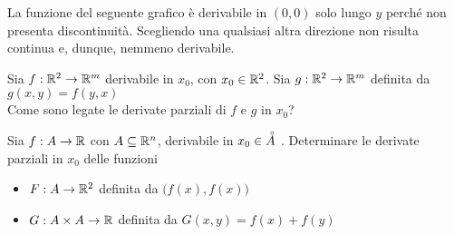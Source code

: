 \begin{example}
	\label{ex:deriv_solo_alcune_direz}
	La funzione del seguente grafico è derivabile in $(0,0)$ solo lungo $y$ perché non presenta discontinuità. Scegliendo una qualsiasi altra direzione non risulta continua e, dunque, nemmeno derivabile.
	\begin{figure}[H]
		\begin{subfigure}{.49\textwidth}
			\centering
		\end{subfigure}
		\begin{subfigure}{.49\textwidth}
			\centering
		\end{subfigure}
	\end{figure}
\end{example}
\begin{exercise}
	Sia $f:\mathbb{R}^2 \to \mathbb{R}^m$ derivabile in $x_0$, con $x_0 \in \mathbb{R}^2$. Sia $g:\mathbb{R}^2 \to \mathbb{R}^m$ definita da $g(x,y) = f(y,x)$\\
	Come sono legate le derivate parziali di $f$ e $g$ in $x_0$?
\end{exercise}
\begin{exercise}
	Sia $f:A \to \mathbb{R}$ con $A \subseteq \mathbb{R}^n$, derivabile in $x_0 \in \accentset{\circ}{A}$ . Determinare le derivate parziali in $x_0$ delle funzioni
	\begin{itemize}
		\item $F:A \to \mathbb{R}^2$ definita da $\bigl( f(x), f(x) \bigr)$
		\item $G:A \times A \to \mathbb{R}$ definita da $G(x,y) = f(x) + f(y)$
	\end{itemize}
\end{exercise}
